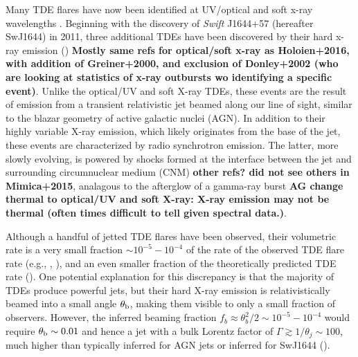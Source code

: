 \documentclass[usenatbib,fleqn]{mnras}
\begin{document}
Many TDE flares have now been identified at UV/optical
\citep{Gezari+2008, Gezari+2009, van-Velzen+2011, Gezari+2012,
  Arcavi+2014, Chornock+2014, Holoien+2014, Vinko+2015, Holoien+2016}
and soft x-ray wavelengths \citep{Bade+1996, Grupe+1999,
  Komossa&Greiner1999, Greiner+2000, Esquej+2007, Maksym+2010,
  Saxton+2012}. Beginning with the discovery of {\it Swift} J1644+57
(hereafter SwJ1644) in 2011, three additional TDEs have been
discovered by their hard x-ray emission (\citealt{Bloom+2011,
  Levan+2011, Burrows+2011, Zauderer+2011, Cenko+2012, Pasham+2015,
  Brown+2015}) {\bf Mostly same refs for optical/soft x-ray as
  Holoien+2016, with addition of Greiner+2000, and exclusion of
  Donley+2002 (who are looking at statistics of x-ray outbursts wo
  identifying a specific event)}.  Unlike the optical/UV and soft
X-ray TDEs, these events are the result of emission from a transient
relativistic jet beamed along our line of sight, similar to the blazar
geometry of active galactic nuclei (AGN).  In addition to their highly
variable X-ray emission, which likely originates from the base of the
jet, these events are characterized by radio synchrotron emission.
The latter, more slowly evolving, is powered by shocks formed at the
interface between the jet and surrounding circumnuclear medium (CNM)
\citep{Bloom+2011,Giannios&Metzger2011,Metzger+2012,Mimica+2015} {\bf
  other refs? did not see others in Mimica+2015}, analagous to the
afterglow of a gamma-ray burst {\bf AG change thermal to optical/UV
  and soft X-ray: X-ray emission may not be thermal (often times
  difficult to tell given spectral data.)}.

Although a handful of jetted TDE flares have been observed, their
volumetric rate is a very small fraction $\sim 10^{-5}-10^{-4}$ of the
rate of the observed TDE flare rate (e.g., \citealt{Burrows+2011},
\citealt{Brown+2015}), and an even smaller fraction of the
theoretically predicted TDE rate (\citealt{Stone&Metzger2016}).  One
potential explanation for this discrepancy is that the majority of
TDEs produce powerful jets, but their hard X-ray emission is
relativistically beamed into a small angle $\theta_{\rm b}$, making
them visible to only a small fraction of observers.  However, the
inferred beaming fraction $f_b \approx \theta_{b}^{2}/2 \sim
10^{-5}-10^{-4}$ would require $\theta_{\rm b} \sim 0.01$ and hence a
jet with a bulk Lorentz factor of $\Gamma \gtrsim 1/\theta_j \sim
100$, much higher than typically inferred for AGN jets or inferred for
SwJ1644 (\citealt{Metzger+2012}).
\end{document}
